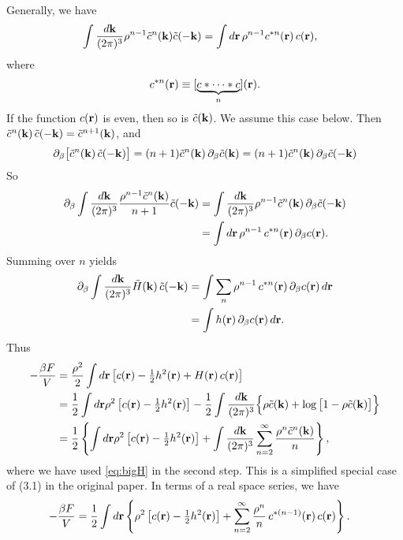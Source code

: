\documentclass[12pt]{article}
\begin{document}
Generally, we have
%
\begin{align*}
  & \int \frac{ d \mathbf{k} }{(2\pi)^3}
    \rho^{n-1} \tilde{c}^n(\mathbf{k})
     \tilde{c}(-\mathbf{k})
  = \int d\mathbf{r} \,
  \rho^{n-1} c^{*n}(\mathbf{r}) \, c(\mathbf{r}),
\end{align*}
where
%
\[
  c^{*n}(\mathbf{r}) \equiv [\underbrace{c*\dots*c}_n](\mathbf{r}).
\]
%
If the function $c(\mathbf{r})$ is even, then so is $\tilde{c}(\mathbf{k})$.
We assume this case below.
Then $\tilde{c}^n(\mathbf{k}) \, \tilde{c}(-\mathbf{k}) = \tilde{c}^{n+1}(\mathbf{k})$,
  and
\[
  \partial_\beta \big[ \tilde{c}^n(\mathbf{k}) \, \tilde{c}(-\mathbf{k}) \big]
  = (n+1) \tilde{c}^n(\mathbf{k}) \, \partial_\beta \tilde{c}(\mathbf{k})
  = (n+1) \tilde{c}^n(\mathbf{k}) \, \partial_\beta \tilde{c}(-\mathbf{k})
\]
So
%
\begin{align*}
  \partial_\beta  \int \frac{ d \mathbf{k} }{(2\pi)^3}
  \frac{\rho^{n-1} \tilde{c}^n(\mathbf{k}) }{n+1} \tilde{c}(-\mathbf{k})
  &= \int \frac{ d \mathbf{k} }{(2\pi)^3}
  \rho^{n-1} \tilde{c}^n(\mathbf{k}) \, \partial_\beta \tilde{c}(-\mathbf{k}) \\
  &=  \int d \mathbf{r} \,
  \rho^{n-1} \, c^{*n}(\mathbf{r}) \, \partial_\beta c(\mathbf{r}).
\end{align*}
%
Summing over $n$ yields
%
\begin{align*}
  \partial_\beta  \int \frac{ d \mathbf{k} }{(2\pi)^3}
  \tilde{H}(\mathbf{k}) \, \tilde{c}(-\mathbf{k})
  &= \int \sum_{n} \rho^{n-1} \, c^{*n}(\mathbf{r}) \, \partial_\beta c(\mathbf{r}) \,
    d \mathbf{r} \\
  &= \int h(\mathbf{r}) \, \partial_\beta c(\mathbf{r}) \,
    d \mathbf{r}.
\end{align*}
%
%
%
Thus
%
\begin{align}
-\frac{\beta F}{V}
&=
  \frac{\rho^2}{2}
  \int d\mathbf{r}
  \left[
    c(\mathbf{r})
    - \tfrac{1}{2} h^2(\mathbf{r})
    + H(\mathbf{r}) \, c(\mathbf{r})
  \right] \notag \\
&=
  \frac{1}{2}
  \int d\mathbf{r} \rho^2
  \left[
     c(\mathbf{r})
    - \tfrac{1}{2} h^2(\mathbf{r})
  \right]
  -
  \frac{1}{2}
  \int \frac{ d \mathbf{k} }{(2\pi)^3}
    \Big\{
      \rho \tilde{c}(\mathbf{k})
      + \log\big[ 1 - \rho \tilde{c}(\mathbf{k})  \big]
    \Big\} \notag \\
&=
  \frac{1}{2}
  \left\{
  \int d\mathbf{r} \rho^2
  \left[
     c(\mathbf{r})
    - \tfrac{1}{2} h^2(\mathbf{r})
  \right]
  +
  \int \frac{ d \mathbf{k} }{(2\pi)^3}
    \sum_{n = 2}^{\infty}
      \frac{  \rho^n \tilde{c}^n(\mathbf{k}) }{n}
  \right\},
\label{eq:freeEnergy}
\end{align}
%
where we have used \eqref{eq:bigH} in the second step.
%
This is a simplified special case of (3.1) in the original paper.
%
In terms of a real space series, we have
%
\begin{align}
-\frac{\beta F}{V}
&=
  \frac{1}{2}
  \int d\mathbf{r}
  \left\{
    \rho^2
    \left[
      c(\mathbf{r})
      - \tfrac{1}{2} h^2(\mathbf{r})
    \right]
  +
  \sum_{n = 2}^{\infty}
  \frac{\rho^{n}}{n} \, c^{*(n-1)}(\mathbf{r}) \, c(\mathbf{r})
  \right\}.
\end{align}
%
\end{document}
